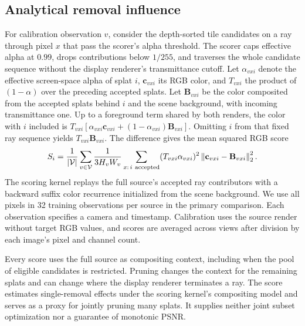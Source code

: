 \documentclass[pdflatex,sn-mathphys]{sn-jnl}
\begin{document}
\subsection{Analytical removal influence}
For calibration observation $v$, consider the depth-sorted tile candidates on a ray through pixel $x$ that pass the scorer's alpha threshold. The scorer caps effective alpha at $0.99$, drops contributions below $1/255$, and traverses the whole candidate sequence without the display renderer's transmittance cutoff. Let $\alpha_{vxi}$ denote the effective screen-space alpha of splat $i$, $\mathbf{c}_{vxi}$ its RGB color, and $T_{vxi}$ the product of $(1-\alpha)$ over the preceding accepted splats. Let $\mathbf{B}_{vxi}$ be the color composited from the accepted splats behind $i$ and the scene background, with incoming transmittance one. Up to a foreground term shared by both renders, the color with $i$ included is $T_{vxi}[\alpha_{vxi}\mathbf{c}_{vxi}+(1-\alpha_{vxi})\mathbf{B}_{vxi}]$. Omitting $i$ from that fixed ray sequence yields $T_{vxi}\mathbf{B}_{vxi}$. The difference gives the mean squared RGB score
\begin{equation}
S_i=\frac{1}{\lvert\mathcal V\rvert}\sum_{v\in\mathcal V}\frac{1}{3H_vW_v}
\sum_{x:\,i\ {\rm accepted}}
(T_{vxi}\alpha_{vxi})^2
\left\lVert\mathbf{c}_{vxi}-\mathbf{B}_{vxi}\right\rVert_2^2.
\label{eq:deletion-score}
\end{equation}
The scoring kernel replays the full source's accepted ray contributors with a backward suffix color recurrence initialized from the scene background. We use all pixels in 32 training observations per source in the primary comparison. Each observation specifies a camera and timestamp. Calibration uses the source render without target RGB values, and scores are averaged across views after division by each image's pixel and channel count.

Every score uses the full source as compositing context, including when the pool of eligible candidates is restricted. Pruning changes the context for the remaining splats and can change where the display renderer terminates a ray. The score estimates single-removal effects under the scoring kernel's compositing model and serves as a proxy for jointly pruning many splats. It supplies neither joint subset optimization nor a guarantee of monotonic PSNR.
\end{document}

